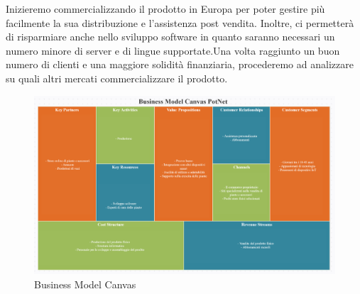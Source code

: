 Inizieremo commercializzando il prodotto in Europa per poter gestire più facilmente la sua distribuzione e l'assistenza post vendita. Inoltre, ci permetterà di risparmiare anche nello sviluppo software in quanto saranno necessari un numero minore di server e di lingue supportate.\newline Una volta raggiunto un buon numero di clienti e una maggiore solidità finanziaria, procederemo ad analizzare su quali altri mercati commercializzare il prodotto.

\begin{figure}[ht!]
	\centering
	\includegraphics[width=\textwidth]{./images/Business-Model-Canvas.PNG} 
	\caption{Business Model Canvas \label{overflow}}
\end{figure}